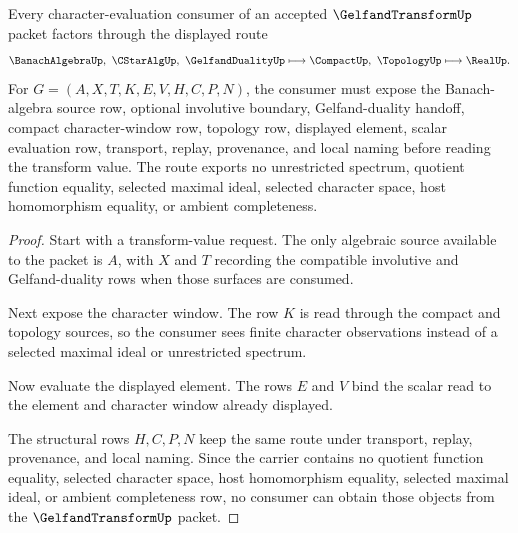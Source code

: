 \begin{theorem}
\label{thm:gelfand-transform-character-evaluation-route}
Every character-evaluation consumer of an accepted $\GelfandTransformUp$ packet factors through the displayed route
$$
\BanachAlgebraUp,\ \CStarAlgUp,\ \GelfandDualityUp
\longmapsto
\CompactUp,\ \TopologyUp
\longmapsto
\RealUp .
$$
For $G=(A,X,T,K,E,V,H,C,P,N)$, the consumer must expose the Banach-algebra source row, optional involutive boundary, Gelfand-duality handoff, compact character-window row, topology row, displayed element, scalar evaluation row, transport, replay, provenance, and local naming before reading the transform value. The route exports no unrestricted spectrum, quotient function equality, selected maximal ideal, selected character space, host homomorphism equality, or ambient completeness.
\end{theorem}
\begin{proof}
Start with a transform-value request. The only algebraic source available to the packet is $A$, with $X$ and $T$ recording the compatible involutive and Gelfand-duality rows when those surfaces are consumed.

Next expose the character window. The row $K$ is read through the compact and topology sources, so the consumer sees finite character observations instead of a selected maximal ideal or unrestricted spectrum.

Now evaluate the displayed element. The rows $E$ and $V$ bind the scalar read to the element and character window already displayed.

The structural rows $H,C,P,N$ keep the same route under transport, replay, provenance, and local naming. Since the carrier contains no quotient function equality, selected character space, host homomorphism equality, selected maximal ideal, or ambient completeness row, no consumer can obtain those objects from the $\GelfandTransformUp$ packet.
\end{proof}



